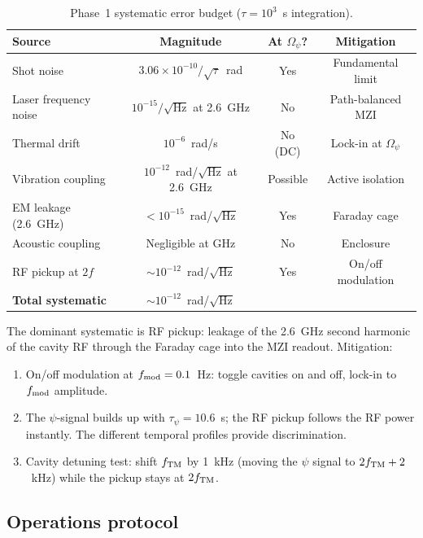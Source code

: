 \documentclass[11pt]{article}
\newcommand{\ee}[1]{\times 10^{#1}}
\newcommand{\Opsi}{\Omega_\psi}
\begin{document}
\begin{table}[H]
\centering
\caption{Phase~1 systematic error budget ($\tau = 10^3$~s integration).}
\begin{tabular}{lccc}
\toprule
Source & Magnitude & At $\Opsi$? & Mitigation \\
\midrule
Shot noise & $3.06\ee{-10}/\sqrt{\tau}$~rad & Yes & Fundamental limit \\
Laser frequency noise & $10^{-15}/\sqrt{\text{Hz}}$ at 2.6~GHz & No & Path-balanced MZI \\
Thermal drift & $10^{-6}$~rad/s & No (DC) & Lock-in at $\Opsi$ \\
Vibration coupling & $10^{-12}$~rad/$\sqrt{\text{Hz}}$ at 2.6~GHz & Possible & Active isolation \\
EM leakage (2.6~GHz) & $< 10^{-15}$~rad/$\sqrt{\text{Hz}}$ & Yes & Faraday cage \\
Acoustic coupling & Negligible at GHz & No & Enclosure \\
RF pickup at $2f$ & $\sim 10^{-12}$~rad/$\sqrt{\text{Hz}}$ & Yes & On/off modulation \\
\midrule
\textbf{Total systematic} & $\sim 10^{-12}$~rad/$\sqrt{\text{Hz}}$ & & \\
\bottomrule
\end{tabular}
\end{table}

The dominant systematic is RF pickup: leakage of the 2.6~GHz second
harmonic of the cavity RF through the Faraday cage into the MZI
readout. Mitigation:
\begin{enumerate}
\item On/off modulation at $f_{\rm mod} = 0.1$~Hz: toggle cavities
on and off, lock-in to $f_{\rm mod}$ amplitude.
\item The $\psi$-signal builds up with $\tau_\psi = 10.6$~s; the
RF pickup follows the RF power instantly. The different temporal
profiles provide discrimination.
\item Cavity detuning test: shift $f_{\rm TM}$ by 1~kHz (moving
the $\psi$ signal to $2f_{\rm TM} + 2$~kHz) while the pickup
stays at $2f_{\rm TM}$.
\end{enumerate}

\subsection{Operations protocol}
\end{document}
